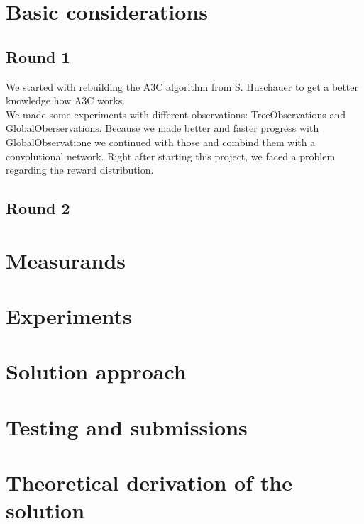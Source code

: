 \section{Basic considerations}

\subsection{Round 1}
We started with rebuilding the A3C algorithm from S. Huschauer to get a better knowledge how A3C works.\\
We made some experiments with different observations: TreeObservations and GlobalOberservations.
Because we made better and faster progress with GlobalObservatione we continued with those and combind them with a convolutional network.
Right after starting this project, we faced a problem regarding the reward distribution.\\


\subsection{Round 2}




\section{Measurands}

\section{Experiments}
%

\section{Solution approach}


\section{Testing and submissions}

\section{Theoretical derivation of the solution}



